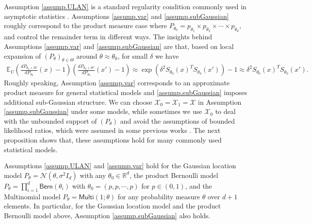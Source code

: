 \documentclass[final,12pt]{colt2018} %
\def \bE {\mathbb{E}}
\def \bR {\mathbb{R}}
\newcommand{\calN}{{\mathcal{N}}}
\newcommand{\calX}{{\mathcal{X}}}
\newtheorem{assumption}{Assumption}
\begin{document}
Assumption \ref{assump.ULAN} is a standard regularity condition commonly used in asymptotic statistics \cite{ibragimov2013statistical}. Assumptions \ref{assump.var} and \ref{assump.subGaussian} roughly correspond to the product measure case where $P_{\theta_0}=p_{\theta_1}\times p_{\theta_2}\times \cdots \times p_{\theta_d}$, and control the remainder term in different ways. The insights behind Assumptions \ref{assump.var} and \ref{assump.subGaussian} are that, based on local expansion of $(P_\theta)_{\theta\in\Theta}$ around $\theta\approx \theta_0$, for small $\delta$ we have
\begin{align*}
\bE_{U} \left(\frac{dP_{\theta_0+\delta U}}{dP_{\theta_0}}(x)-1\right) \left(\frac{dP_{\theta_0+\delta U}}{dP_{\theta_0}}(x') -1 \right) \approx \exp(\delta^2 S_{\theta_0}(x)^TS_{\theta_0}(x')) - 1 \approx \delta^2 S_{\theta_0}(x)^TS_{\theta_0}(x').
\end{align*}
Roughly speaking, Assumption \ref{assump.var} corresponds to an approximate product measure for general statistical models and \ref{assump.subGaussian} imposes additional sub-Gaussian structure. %
We can choose $\calX_0=\calX_1=\calX$ in Assumption \ref{assump.subGaussian} under some models, while sometimes we use $\calX_0$ to deal with the unbounded support of $(P_\theta)$ and avoid the assumptions of bounded likelihood ratios, which were assumed in some previous works \cite{braverman2016communication}. The next proposition shows that, these assumptions hold for many commonly used statistical models. 
\begin{proposition}\label{prop.assumption}
	Assumptions \ref{assump.ULAN} and \ref{assump.var} hold for the Gaussian location model $P_\theta=\calN(\theta, \sigma^2I_d)$ with any $\theta_0\in \bR^d$, the product Bernoulli model $P_\theta = \prod_{i=1}^d \mathsf{Bern}(\theta_i)$ with $\theta_0 = (p,p,\cdots,p)$ for $p\in (0,1)$, and the Multinomial model $P_\theta = \mathsf{Multi}(1; \theta)$ for any probability measure $\theta$ over $d+1$ elements. In particular, for the Gaussian location model and the product Bernoulli model above, Assumption \ref{assump.subGaussian} also holds.
\end{proposition}

%
\end{document}
